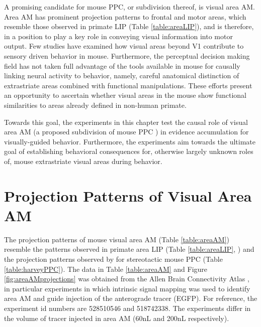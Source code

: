 A promising candidate for mouse PPC, or subdivision thereof, is visual area AM. Area AM has prominent projection patterns to frontal and motor areas, which resemble those observed in primate LIP (Table \ref{table:areaLIP}), and is therefore, in a position to play a key role in conveying visual information into motor output. Few studies have examined how visual areas beyond V1 contribute to sensory driven behavior in mouse. Furthermore, the perceptual decision making field has not taken full advantage of the tools available in mouse for causally linking neural activity to behavior, namely, careful anatomical distinction of extrastriate areas combined with functional manipulations. These efforts present an opportunity to ascertain whether visual areas in the mouse show functional similarities to areas already defined in non-human primate.\par 

Towards this goal, the experiments in this chapter test the causal role of visual area AM (a proposed subdivision of mouse PPC ) in evidence accumulation for visually-guided behavior. Furthermore, the experiments aim towards the ultimate goal of establishing behavioral consequences for, otherwise largely unknown roles of, mouse extrastriate visual areas during behavior.\par 

\section{Projection Patterns of Visual Area AM}
The projection patterns of mouse visual area AM (Table \ref{table:areaAM}) resemble the patterns observed in primate area LIP (Table \ref{table:areaLIP}, \parencite{Cavada1989a,Cavada1989b,Cavada1989c}) and the projection patterns observed by \textcite{Harvey2012} for stereotactic mouse PPC (Table \ref{table:harveyPPC}). The data in Table \ref{table:areaAM} and Figure \ref{fig:areaAMprojections} was obtained from the Allen Brain Connectivity Atlas \parencite{AllenBrain2015}, in particular experiments in which intrinsic signal mapping was used to identify area AM and guide injection of the anterograde tracer (EGFP). For reference, the experiment id numbers are 528510546 and 518742338. The experiments differ in the volume of tracer injected in area AM (60nL and 200nL respectively). \par 


